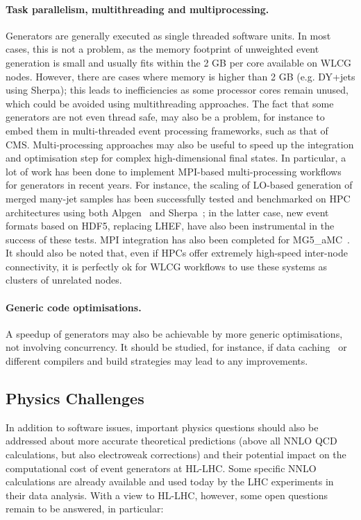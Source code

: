 \documentclass[11pt,a4paper]{article}
\begin{document}
\paragraph{Task parallelism, multithreading and multiprocessing.} Generators are
generally executed as single threaded software units. In most cases,
this is not a problem, as the memory footprint of unweighted event
generation is small and usually fits within the 2 GB per core available
on WLCG nodes. However, there are cases where memory is higher than 2 GB
(e.g. DY+jets using Sherpa); this leads to inefficiencies as some
processor cores remain unused, which could be avoided using
multithreading approaches. The fact that some generators are not even
thread safe, may also be a problem, for instance to embed them in
multi-threaded event processing frameworks, such as that of CMS.
Multi-processing approaches may also be useful to speed up the
integration and optimisation step for complex high-dimensional final
states. In particular, a lot of work has been done to implement
MPI-based multi-processing workflows for generators in recent years. For
instance, the scaling of LO-based generation of merged many-jet samples
has been successfully tested and benchmarked on HPC architectures using
both Alpgen~\cite{Chi17} and Sherpa~\cite{Hoe19}; in the latter case, new
event formats based on HDF5, replacing LHEF, have also been instrumental
in the success of these tests. MPI integration has also been completed
for MG5\_aMC~\cite{Mat18}. It should also be noted that, even if HPCs
offer extremely high-speed inter-node connectivity, it is perfectly ok
for WLCG workflows to use these systems as clusters of unrelated nodes.

\paragraph{Generic code optimisations.} A speedup of generators may also be
achievable by more generic optimisations, not involving concurrency. It
should be studied, for instance, if data caching~\cite{Kon20} or
different compilers and build strategies may lead to any improvements.

\hypertarget{physics-challenges}{%
\subsection{Physics Challenges}\label{physics-challenges}}

In addition to software issues, important physics questions should also
be addressed about more accurate theoretical predictions (above all NNLO
QCD calculations, but also electroweak corrections) and their potential
impact on the computational cost of event generators at HL-LHC. Some
specific NNLO calculations are already available and used today by the
LHC experiments in their data analysis. With a view to HL-LHC, however,
some open questions remain to be answered, in particular:
\end{document}
